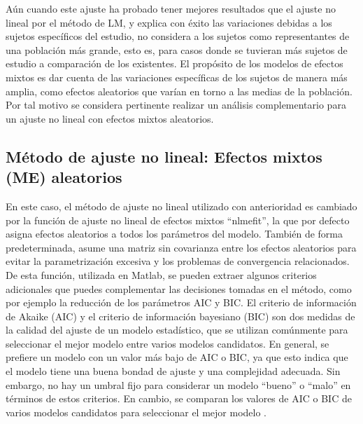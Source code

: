 Aún cuando este ajuste ha probado tener mejores resultados que el ajuste no lineal por el método de LM, y explica con éxito las variaciones debidas a los sujetos específicos del estudio, no considera a los sujetos como representantes de una población más grande, esto es, para casos donde se tuvieran más sujetos de estudio a comparación de los existentes. El propósito de los modelos de efectos mixtos es dar cuenta de las variaciones específicas de los sujetos de manera más amplia, como efectos aleatorios que varían en torno a las medias de la población. Por tal motivo se considera pertinente realizar un análisis complementario para un ajuste no lineal con efectos mixtos aleatorios. %
\pagebreak
\subsection{Método de ajuste no lineal: Efectos mixtos (ME) aleatorios}

En este caso, el método de ajuste no lineal utilizado con anterioridad es cambiado por la función de ajuste no lineal de efectos mixtos ``nlmefit'', la que por defecto  asigna efectos aleatorios a todos los parámetros del modelo. También de forma predeterminada, asume una matriz sin covarianza entre los efectos aleatorios para evitar la parametrización excesiva y los problemas de convergencia relacionados.\\

De esta función, utilizada en Matlab, se pueden extraer algunos criterios adicionales que puedes complementar las decisiones tomadas en el método, como por ejemplo la reducción de los parámetros AIC y BIC. El criterio de información de Akaike (AIC) y el criterio de información bayesiano (BIC) son dos medidas de la calidad del ajuste de un modelo estadístico, que se utilizan comúnmente para seleccionar el mejor modelo entre varios modelos candidatos. En general, se prefiere un modelo con un valor más bajo de AIC o BIC, ya que esto indica que el modelo tiene una buena bondad de ajuste y una complejidad adecuada. Sin embargo, no hay un umbral fijo para considerar un modelo ``bueno'' o ``malo'' en términos de estos criterios. En cambio, se comparan los valores de AIC o BIC de varios modelos candidatos para seleccionar el mejor modelo \cite{matlabmixed}.\\

